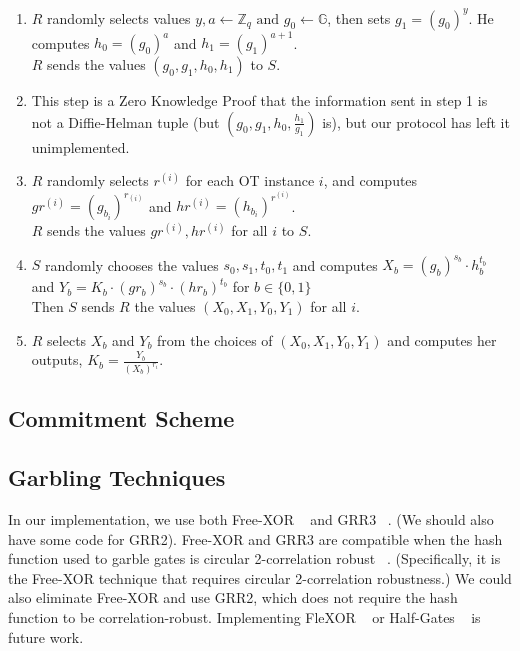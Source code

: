 \documentclass{article}
\begin{document}
\begin{enumerate}
	\item $R$ randomly selects values $y,a \leftarrow \mathbb{Z}_{q} \text{ and } g_{0} \leftarrow \mathbb{G}$, then sets $g_{1}=(g_{0})^{y}$. He computes $h_{0} = (g_{0})^{a}$ and $h_{1} = (g_{1})^{a + 1}$. \\
	$R$ sends the values $(g_{0},g_{1},h_{0}, h_{1})$ to $S$.
	\item This step is a Zero Knowledge Proof that the information sent in step 1 is not a Diffie-Helman tuple (but $(g_{0},g_{1},h_{0}, \frac{h_{1}}{g_{1}})$ is), but our protocol has left it unimplemented.
	\item $R$ randomly selects $r^{(i)}$ for each OT instance $i$, and computes $gr^{(i)} = (g_{b_i})^{r_{(i)}}$ and $hr^{(i)}= (h_{b_{i}})^{r^{(i)}}$. \\
	 $R$ sends the values $gr^{(i)}, hr^{(i)}$ for all $i$ to $S$. 
	\item $S$ randomly chooses the values $s_{0},s_{1},t_{0},t_{1}$ and computes $X_{b} = (g_{b})^{s_{b}} \cdot h_{b}^{t_{b}}$ and $Y_{b} = K_{b} \cdot (gr_{b})^{s_{b}} \cdot (hr_{b})^{t_{b}}$ for $b \in \{0,1\}$\\
	Then $S$ sends $R$ the values $(X_{0},X_{1},Y_{0},Y_{1})$ for all $i$.
	\item $R$ selects $X_{b}$ and $Y_{b}$ from the choices of $(X_{0},X_{1},Y_{0},Y_{1})$ and computes her outputs, $K_{b} = \frac{Y_{b}}{(X_{b})^{r_i}}$.
\end{enumerate}


\subsection{Commitment Scheme} \label{comm-scheme}



\subsection{Garbling Techniques}
In our implementation, we use both Free-XOR ~\cite{freeXOR} and GRR3 ~\cite{GRR}. (We should also have some code for GRR2). Free-XOR and GRR3 are compatible when the hash function used to garble gates is circular 2-correlation robust ~\cite{GRR, freeXOR-security}. (Specifically, it is the Free-XOR technique that requires circular 2-correlation robustness.) We could also eliminate Free-XOR and use GRR2, which does not require the hash function to be correlation-robust. Implementing FleXOR ~\cite{flexor} or Half-Gates ~\cite{half-gates} is future work.
\end{document}
